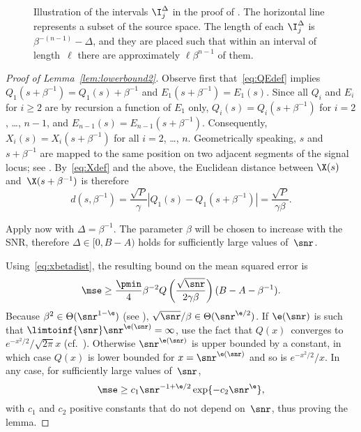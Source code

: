 \begin{figure}
  \begin{center}
    
  \end{center}
  \caption{Illustration of the intervals $\I_j^\Delta$ in the proof of
  . The horizontal line represents a subset of the source
  space. The length of each $\I_j^\Delta$ is $\beta^{-(n-1)} -
  \Delta$, and they are placed such that within an interval of length~$\ell$
  there are approximately $\ell \beta^{n-1}$ of them.}
  \label{fig:lowerbound1intervals}
\end{figure}

\begin{proof}[Proof of Lemma~\ref{lem:lowerbound2}]
  Observe first that~\eqref{eq:QEdef} implies $Q_1(s + \beta^{-1}) = Q_1(s) +
  \beta^{-1}$ and $E_1(s + \beta^{-1}) = E_1(s)$. Since all $Q_i$ and $E_i$ for
  $i \ge 2$ are by recursion a function of $E_1$ only, $Q_i(s) = Q_i(s +
  \beta^{-1})$ for $i = 2$, \dots, $n-1$, and $E_{n-1}(s) = E_{n-1}(s +
  \beta^{-1})$. Consequently,  $X_i(s) = X_i(s + \beta^{-1})$ for all $i =
  2$, \dots, $n$. Geometrically speaking, $s$ and $s + \beta^{-1}$ are mapped to
  the same position on two adjacent segments of the signal locus; see
  . By~\eqref{eq:Xdef} and the above, the Euclidean distance
  between $\X(s)$ and~$\X(s+\beta^{-1})$ is therefore
  \begin{equation}
    \label{eq:xbetadist}
    d(s, \beta^{-1}) = \frac{\sqrt P}{\gamma} |Q_1(s) - Q_1(s+\beta^{-1})| 
    = \frac{\sqrt P}{\gamma\beta}.
  \end{equation}

  Apply now  with $\Delta = \beta^{-1}$. The
  parameter $\beta$ will be chosen to increase with the SNR, therefore $\Delta
  \in [0, B-A)$ holds for sufficiently large values of~$\snr$.

  Using~\eqref{eq:xbetadist}, the resulting bound on the mean squared error is
  \begin{equation*}
    \mse \ge \frac{\pmin}{4} \beta^{-2}
    Q\left (\frac{\sqrt{\snr}}{2\gamma\beta}  \right) (B-A-\beta^{-1}
    ).
  \end{equation*}
  Because $\beta^2 \in \Theta(\snr^{1-\e})$ (see ),
  $\sqrt{\snr}/\beta \in \Theta(\snr^{\e/2})$. If $\e(\snr)$ is such that
  $\limtoinf{\snr} \snr^{\e(\snr)} = \infty$, use the fact that $Q(x)$~converges
  to $e^{-x^2/2}/\sqrt{2\pi}x$ (cf.~\cite[.12]{AbramowitzS1964}).
  Otherwise $\snr^{\e(\snr)}$ is upper bounded by a constant, in which case
  $Q(x)$ is lower bounded for $x = \snr^{\e(\snr)}$ and so is $e^{-x^2/2}/x$.
  In any case, for sufficiently large values of~$\snr$,
  \begin{equation*}
    \mse \ge c_1 \snr^{-1 + \e/2} \exp\{-c_2\snr^\e\},
  \end{equation*}
  with $c_1$ and $c_2$ positive constants that do not depend on~$\snr$, thus
  proving the lemma.
\end{proof}

